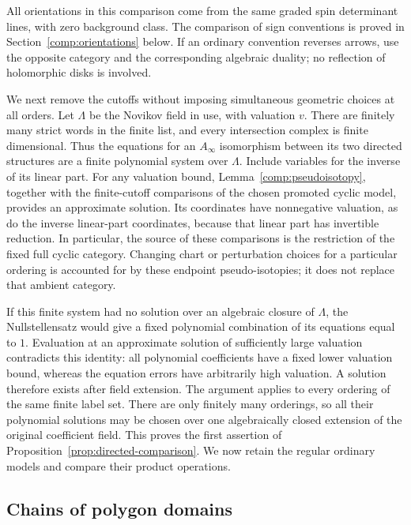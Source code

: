 \documentclass[11pt]{article}
\numberwithin{equation}{section}
\theoremstyle{definition}
\theoremstyle{remark}
\begin{document}
All orientations in this comparison come from the same graded spin
determinant lines, with zero background class.  The comparison of
sign conventions is proved in Section~\ref{comp:orientations} below.
If an ordinary convention reverses arrows, use the opposite
category and the corresponding algebraic duality; no reflection of
holomorphic disks is involved.

We next remove the cutoffs without imposing simultaneous geometric
choices at all orders.  Let $\Lambda$ be the Novikov field in use,
with valuation $v$.  There are finitely many strict words in the
finite list, and every intersection complex is finite dimensional.
Thus the equations for an $A_\infty$ isomorphism between its two
directed structures are a finite polynomial system over $\Lambda$.
Include variables for the inverse of its linear part.  For any
valuation bound, Lemma~\ref{comp:pseudoisotopy}, together with the
finite-cutoff comparisons of the chosen promoted cyclic model, provides an
approximate solution.  Its coordinates have nonnegative valuation,
as do the inverse linear-part coordinates, because that linear
part has invertible reduction.  In particular, the source of
these comparisons is the restriction of the fixed full cyclic category.
Changing chart or perturbation choices for a particular ordering is
accounted for by these endpoint pseudo-isotopies; it does not replace
that ambient category.

If this finite system had no solution over an algebraic closure of
$\Lambda$, the Nullstellensatz would give a fixed polynomial
combination of its equations equal to $1$.  Evaluation at an
approximate solution of sufficiently large valuation contradicts
this identity: all polynomial coefficients have a fixed lower
valuation bound, whereas the equation errors have arbitrarily high
valuation.  A solution therefore exists after field extension.
The argument applies to every ordering of the same finite label set.
There are only finitely many orderings, so all their polynomial
solutions may be chosen over one algebraically closed extension of
the original coefficient field.  This proves the first assertion of
Proposition~\ref{prop:directed-comparison}.  We now retain the
regular ordinary models and compare their product operations.

\subsection{Chains of polygon domains}
\label{comp:domain-chains}
\end{document}
